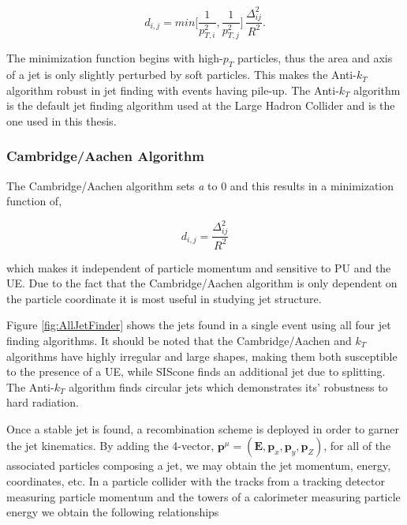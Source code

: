\begin{equation}
d_{i,j} = min \Bigg [\frac{1}{p^{2}_{T,i}}, \frac{1}{p^{2}_{T,j}} \Bigg ] \, \frac{\Delta^{2}_{ij}}{R^{2}}.
\label{eq:Akt}
\end{equation}

The minimization function begins with high-$p_{T}$ particles, thus the area and axis of a jet is only slightly perturbed by soft particles.  This makes the Anti-$k_{T}$ algorithm robust in jet finding with events having pile-up.  The Anti-$k_{T}$ algorithm is the default jet finding algorithm used at the Large Hadron Collider and is the one used in this thesis.

\subsubsection{Cambridge/Aachen Algorithm}

The Cambridge/Aachen algorithm sets \textit{a} to 0 and this results in a minimization function of,

\begin{equation}
d_{i,j} = \frac{\Delta^{2}_{ij}}{R^{2}}
\label{eq:CBalg}
\end{equation}

\noindent
which makes it independent of particle momentum and sensitive to PU and the UE.  Due to the fact that the Cambridge/Aachen algorithm is only dependent on the particle coordinate it is most useful in studying jet structure.

Figure \ref{fig:AllJetFinder} shows the jets found in a single event using all four jet finding algorithms.  It should be noted that the Cambridge/Aachen and $k_{T}$ algorithms have highly irregular and large shapes, making them both susceptible to the presence of a UE, while SIScone finds an additional jet due to splitting.  The Anti-$k_{T}$ algorithm finds circular jets which demonstrates its' robustness to hard radiation.  


Once a stable jet is found, a recombination scheme is deployed in order to garner the jet kinematics.  By adding the 4-vector, $\boldsymbol{p}^{\mu} = (\boldsymbol{E},\boldsymbol{p}_{x},\boldsymbol{p}_{y},\boldsymbol{p}_{Z})$, for all of the associated particles composing a jet, we may obtain the jet momentum, energy, coordinates, etc.  In a particle collider with the tracks from a tracking detector measuring particle momentum and the towers of a calorimeter measuring particle energy we obtain the following relationships



